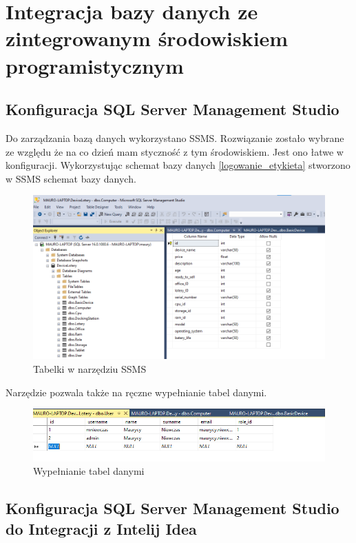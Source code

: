 \chapter{Integracja bazy danych ze zintegrowanym środowiskiem programistycznym}

\section{Konfiguracja SQL Server Management Studio}

Do zarządzania bazą danych wykorzystano SSMS. Rozwiązanie zostało wybrane ze względu że na co dzień mam styczność z tym środowiskiem. Jest ono łatwe w konfiguracji. Wykorzystując schemat bazy danych \ref{logowanie_etykieta} stworzono w SSMS schemat bazy danych. 
\begin{figure}[h]
    \includegraphics[scale=0.7]{rys05/ssms_tabelki.png}
    \caption{Tabelki w narzędziu SSMS}
    \label{ssms_tabelki_etykieta}
\end{figure}

\newpage
Narzędzie pozwala także na ręczne wypełnianie tabel danymi. 
\begin{figure}[h]
    \includegraphics[scale=0.7]{rys05/dodawanie_tabel.png}
    \caption{Wypełnianie tabel danymi}
    \label{ssms_wypelnianie_tabel_etykieta}
\end{figure}

\section{Konfiguracja SQL Server Management Studio do Integracji z Intelij Idea}

